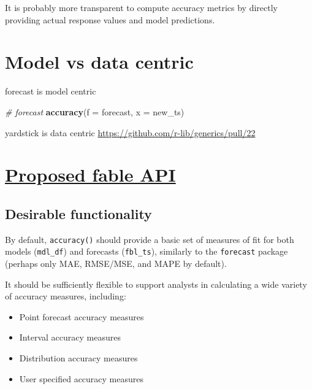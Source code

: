 \documentclass[]{book}
\newenvironment{Shaded}{\begin{snugshade}}{\end{snugshade}}
\newcommand{\CommentTok}[1]{\textcolor[rgb]{0.56,0.35,0.01}{\textit{#1}}}
\newcommand{\DataTypeTok}[1]{\textcolor[rgb]{0.13,0.29,0.53}{#1}}
\newcommand{\KeywordTok}[1]{\textcolor[rgb]{0.13,0.29,0.53}{\textbf{#1}}}
\newcommand{\NormalTok}[1]{#1}
\newcommand{\OperatorTok}[1]{\textcolor[rgb]{0.81,0.36,0.00}{\textbf{#1}}}
\newcommand{\StringTok}[1]{\textcolor[rgb]{0.31,0.60,0.02}{#1}}
\providecommand{\tightlist}{%
  \setlength{\itemsep}{0pt}\setlength{\parskip}{0pt}}
\begin{document}
It is probably more transparent to compute accuracy metrics by directly providing actual response values and model predictions.

\hypertarget{model-vs-data-centric}{%
\section{Model vs data centric}\label{model-vs-data-centric}}

forecast is model centric

\begin{Shaded}
\begin{Highlighting}[]
\CommentTok{# forecast}
\KeywordTok{accuracy}\NormalTok{(}\DataTypeTok{f =}\NormalTok{ forecast, }\DataTypeTok{x =}\NormalTok{ new_ts)}
\end{Highlighting}
\end{Shaded}

yardstick is data centric
\url{https://github.com/r-lib/generics/pull/22}

\begin{Shaded}
\end{Shaded}

\hypertarget{proposed-fable-api}{%
\section{\texorpdfstring{\href{https://github.com/tidyverts/fable/issues/66}{Proposed fable API}}{Proposed fable API}}\label{proposed-fable-api}}

\hypertarget{desirable-functionality}{%
\subsection{Desirable functionality}\label{desirable-functionality}}

By default, \texttt{accuracy()} should provide a basic set of measures of fit for both models (\texttt{mdl\_df}) and forecasts (\texttt{fbl\_ts}), similarly to the \texttt{forecast} package (perhaps only MAE, RMSE/MSE, and MAPE by default).

It should be sufficiently flexible to support analysts in calculating a wide variety of accuracy measures, including:

\begin{itemize}
\tightlist
\item
  Point forecast accuracy measures
\item
  Interval accuracy measures
\item
  Distribution accuracy measures
\item
  User specified accuracy measures
\end{itemize}
\end{document}
